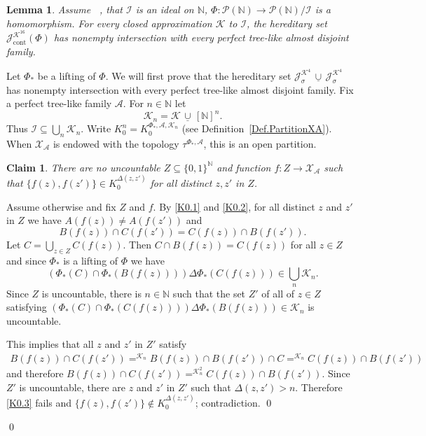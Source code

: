 \documentclass{amsart}
\makeatletter
\def\N{\mathbb N}                        %
\newtheorem{lemma}[proposition]{Lemma}
\newtheorem{claim}{Claim}
\theoremstyle{definition}
\theoremstyle{remark}
\def\twoo{\{0,1\}^{\N}}
\newcommand{\ucup}{\,\underline{\cup}\,}
\DeclareMathOperator{\Ccont}{cont}
\newcommand{\Jcont}{\cJ_{\Ccont}}
\newcommand{\Jsigma}{\cJ_\sigma}
\newcommand{\cK}{{\mathcal K}}
\renewcommand{\proofname}{Proof}
\renewenvironment{proof}[1][\proofname]{\par
\let\oldqedsymbol\qedsymbol             %
  \normalfont
  \topsep6\p@\@plus6\p@ \trivlist
  \item[\hskip\labelsep\hskip\parindent\scshape
    #1\@addpunct{.}]\ignorespaces
}{%
  \qed\endtrivlist
\global\let\qedsymbol\oldqedsymbol      %
}
\newcommand{\cP}{\mathcal P}
\newcommand{\bbN}{\mathbb N}
\newcommand{\cI}{{\mathcal I}} %
\newcommand{\cJ}{{\mathcal J}} %
\newcommand{\cA}{\mathcal A}
\newcommand{\cX}{\mathcal X}
\DeclareMathOperator{\OCAT}{OCA_T}
\numberwithin{claim}{subsection}
\makeatother
\begin{document}
\begin{lemma}\label{Lemma.Jsigma.nonmeager} 
	Assume $\OCAT$, that $\cI$ is an ideal on $\bbN$, $\Phi\colon \cP(\bbN)\to \cP(\bbN)/\cI$ is a homomorphism. 
For every closed approximation $\cK$ to $\cI$, the hereditary set $\Jcont^{\cK^{16}}(\Phi) $
	has nonempty intersection with every perfect tree-like almost disjoint family.
\end{lemma}

\begin{proof} Let $\Phi_*$ be a lifting of $\Phi$. 
We will first prove that the hereditary set $\Jsigma^{\cK^4}\ucup \Jsigma^{\cK^4}$
	has nonempty intersection with every perfect tree-like almost disjoint family.
		Fix a perfect tree-like family $\cA$. 
For $n\in \bbN$ let 
\[
\cK_n=\cK\ucup [\bbN]^n. 
\]
Thus $\cI\subseteq \bigcup_n \cK_n$. 	Write $K^n_0=K^{\Phi_*,\cA,\cK_n}_0$ (see Definition~\ref{Def.PartitionXA}). When $\cX_\cA$ is endowed with the topology $\tau^{\Phi_*,\cA}$, this is an open partition. 
	

\begin{claim}
	\label{C.K0-homogeneous} There are no uncountable $Z\subseteq \twoo$ and function $f\colon Z\to \cX_\cA$ such that $\{f(z), f(z')\}\in K^{\Delta(z,z')}_0$ for all distinct $z,z'$ in $Z$. 
\end{claim}

\begin{proof}{}Assume otherwise and fix $Z$ and $f$. By \eqref{K0.1} and \eqref{K0.2},  for all distinct $z$ and $z'$ in $Z$ we have $A(f(z))\neq A(f(z'))$ and \[
	B(f(z))\cap C(f(z'))=C(f(z))\cap B(f(z')).
\] 
	Let 
	$C=\bigcup_{z\in Z} C(f(z))$. Then $C\cap B(f(z))=C(f(z))$ for all $z\in Z$ and since $\Phi_*$ is a lifting of $\Phi$ we have 
	\[
	(\Phi_*(C)\cap\Phi_*(B(f(z))))\Delta \Phi_*(C(f(z)))\in \bigcup_n \cK_n.
	\] 
	Since $Z$ is uncountable, there is $n\in \bbN$ such that the set $Z'$ of all of $z\in Z$ satisfying 	$(\Phi_*(C)\cap\Phi_*(C(f(z))))\Delta \Phi_*(B(f(z)))\in \cK_n$ is uncountable.

This implies that all $z$ and $z'$ in $Z'$ satisfy 
\begin{align*}
	B(f(z))\cap C(f(z'))=^{\cK_n}B(f(z))\cap B(f(z'))\cap C =^{\cK_n} C(f(z))\cap B(f(z'))
\end{align*}
and therefore $B(f(z))\cap C(f(z'))=^{\cK_n^2} C(f(z))\cap B(f(z'))$. 
	Since $Z'$ is uncountable, there are $z$ and $z'$ in $Z'$ such that $\Delta(z,z')>n$. Therefore \eqref{K0.3} fails and  $\{f(z),f(z')\}\notin K_0^{\Delta(z,z')}$; contradiction.  
\end{proof}


\end{proof}
\end{document}
